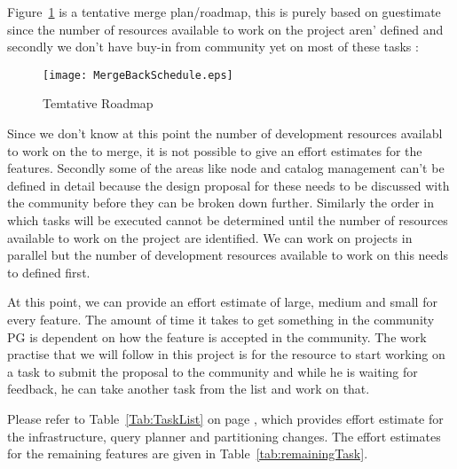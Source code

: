 	Figure~\ref{plan:roadmap} is a tentative merge plan/roadmap, this is purely based on guestimate
	since the number of resources available to work on the project aren’
   	defined and secondly we don’t have buy-in from community yet on most of these tasks :

	\begin{figure}[htp]
		\begin{center}
			\texttt{[image: MergeBackSchedule.eps]}
			\caption{\label{plan:roadmap}Temtative Roadmap}
		\end{center}
	\end{figure}

	Since we don’t know at this point the number of development resources availabl
   	to work on the \XC{} to \PG{} merge, it is not possible to give an effort estimates
	for the features.
	Secondly some of the areas like node and catalog management can’t be defined in detail
   	because the design proposal for these needs to be discussed with the community before
	they can be broken down further.
	Similarly the order in which tasks will be executed cannot be determined until
	the number of resources available to work on the project are identified. We can work
	on projects in parallel but the number of development resources available to work on
	this needs to defined first.

	At this point, we can provide an effort estimate of large, medium and small for every
	feature.
	The amount of time it takes to get something in the community PG is dependent on
	how the feature is accepted in the community.
	The work practise that we will follow in this project is for the resource to start working
	on a task to submit the proposal to the community and while he is waiting for feedback,
	he can take another task from the list and work on that.

	Please refer to Table~\ref{Tab:TaskList} on page \pageref{Tab:TaskList}, which provides
	effort estimate for the infrastructure, query planner and partitioning changes.
	The effort estimates for the remaining features are given in Table~\ref{tab:remainingTask}.

